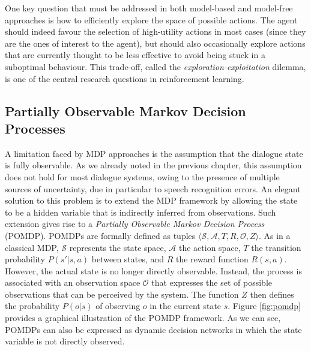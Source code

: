 One key question that must be addressed in both model-based and model-free approaches is how  to efficiently explore the space of possible actions.  The agent should indeed favour the selection of high-utility actions in most cases (since they are the ones of interest to the agent), but should also occasionally explore actions that are currently thought to be less effective to avoid being stuck in a suboptimal behaviour. This trade-off, called the \textit{exploration-exploitation} dilemma, is one of the central research questions in reinforcement learning. 


\subsection{Partially Observable Markov Decision Processes}
\label{sec:pomdp}

A limitation faced by MDP approaches is the assumption that the dialogue state is fully observable. As we already noted in the previous chapter, this assumption does not hold for most dialogue systems, owing to the presence of multiple sources of uncertainty, due in particular to speech recognition errors.  An elegant solution to this problem is to extend the MDP framework by allowing the state to be a hidden variable that is indirectly inferred from observations.  Such extension gives rise to a  \textit{Partially Observable Markov Decision Process} (POMDP).  POMDPs are formally defined as tuples $\langle \mathcal{S}, \mathcal{A}, T, R, \mathcal{O}, Z \rangle$.  As in a classical MDP, $\mathcal{S}$ represents the state space, $\mathcal{A}$ the action space, $T$ the transition probability $P(s'|s,a)$ between states, and $R$ the reward function $R(s,a)$.  However, the actual state is no longer directly observable.  Instead, the process is associated with an observation space $\mathcal{O}$ that expresses the set of possible observations that can be perceived by the system. The function $Z$ then defines the probability $P(o|s)$ of observing $o$ in the current state $s$.  Figure \ref{fig:pomdp} provides a graphical illustration of the POMDP framework.  As we can see, POMDPs can also be expressed as dynamic decision networks in which the state variable is not directly observed. 


